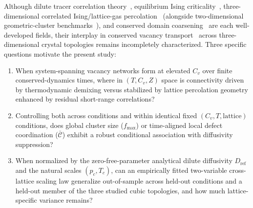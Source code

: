 \documentclass[aps,pre,reprint,superscriptaddress,amsmath,amssymb,floatfix]{revtex4-2}
\begin{document}
Although dilute tracer correlation theory~\cite{Bardeen1952,Compaan1956,Manning1968}, equilibrium Ising criticality~\cite{Lee1952,Binder2001}, three-dimensional correlated Ising/lattice-gas percolation~\cite{MullerKrumbhaar1974,Coniglio1980,Kertesz1989,DOnorioDeMeo1990,Zhu2026} (alongside two-dimensional geometric-cluster benchmarks~\cite{Fortunato2002}), and conserved domain coarsening~\cite{Lifshitz1961,Wagner1961,Huse1986,Amar1988,Bray1994,Majumder2011} are each well-developed fields, their interplay in conserved vacancy transport~\cite{Kawasaki1966,Kawasaki1972} across three-dimensional crystal topologies remains incompletely characterized. Three specific questions motivate the present study:
\begin{enumerate}
  \item When system-spanning vacancy networks form at elevated $C_v$ over finite conserved-dynamics times, where in $(T, C_v, Z)$ space is connectivity driven by thermodynamic demixing versus stabilized by lattice percolation geometry enhanced by residual short-range correlations?
  \item Controlling both across conditions and within identical fixed $(C_v, T, \text{lattice})$ conditions, does global cluster size ($f_{\max}$) or time-aligned local defect coordination ($\bar{\mathcal{C}}$) exhibit a robust conditional association with diffusivity suppression?
  \item When normalized by the zero-free-parameter analytical dilute diffusivity $D_{\mathrm{ref}}$ and the natural scales $(p_c, T_c)$, can an empirically fitted two-variable cross-lattice scaling law generalize out-of-sample across held-out conditions and a held-out member of the three studied cubic topologies, and how much lattice-specific variance remains?
\end{enumerate}
\end{document}
